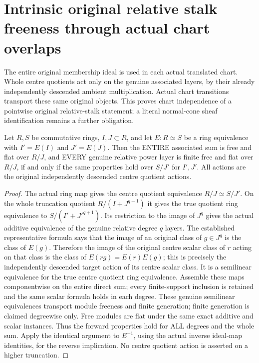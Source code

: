 \section{Intrinsic original relative stalk freeness through actual chart overlaps}

The entire original membership ideal is used in each actual translated
chart. Whole centre quotients act only on the genuine associated layers,
by their already independently descended ambient multiplication. Actual
chart transitions transport these same original objects. This proves
chart independence of a pointwise original relative-stalk statement;
a literal normal-cone sheaf identification remains a further obligation.

\begin{lemma}
\label{hir:real-domain-all-relative-degrees-free-ring-equivalence}
\leanok
Let $R,S$ be commutative rings, $I,J\subset R$, and let $E:R\simeq S$
be a ring equivalence with $I'=E(I)$ and $J'=E(J)$. Then the ENTIRE
associated sum is free and flat over $R/J$, and EVERY genuine relative
power layer is finite free and flat over $R/J$, if and only if the same
properties hold over $S/J'$ for $I',J'$. All actions are the original
independently descended centre quotient actions.
\end{lemma}
\begin{proof}
The actual ring map gives the centre quotient equivalence $R/J\simeq S/J'$.
On the whole truncation quotient $R/(I+J^{q+1})$ it gives the true quotient
ring equivalence to $S/(I'+J'^{q+1})$. Its restriction to the image of $J^q$
gives the actual additive equivalence of the genuine relative degree $q$
layers. The established representative formula says that the image of an
original class of $g\in J^q$ is the class of $E(g)$. Therefore the image of
the original centre scalar class of $r$ acting on that class is the class
of $E(rg)=E(r)E(g)$; this is precisely the independently descended target
action of its centre scalar class. It is a semilinear equivalence for the
true centre quotient ring equivalence. Assemble these maps componentwise
on the entire direct sum; every finite-support inclusion is retained and
the same scalar formula holds in each degree. These genuine semilinear
equivalences transport module freeness and finite generation; finite
generation is claimed degreewise only. Free modules are flat under the
same exact additive and scalar instances. Thus the forward properties
hold for ALL degrees and the whole sum. Apply the identical argument to
$E^{-1}$, using the actual inverse ideal-map identities, for the reverse
implication. No centre quotient action is asserted on a higher truncation.
\end{proof}

